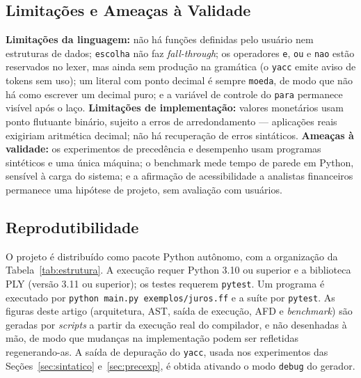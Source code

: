 \documentclass[conference]{IEEEtran}
\begin{document}
\subsection{Limitações e Ameaças à Validade}

\textbf{Limitações da linguagem:} não há funções definidas pelo usuário nem estruturas de dados; \texttt{escolha} não faz \textit{fall-through}; os operadores \texttt{e}, \texttt{ou} e \texttt{nao} estão reservados no lexer, mas ainda sem produção na gramática (o \texttt{yacc} emite aviso de tokens sem uso); um literal com ponto decimal é sempre \texttt{moeda}, de modo que não há como escrever um decimal puro; e a variável de controle do \texttt{para} permanece visível após o laço. \textbf{Limitações de implementação:} valores monetários usam ponto flutuante binário, sujeito a erros de arredondamento --- aplicações reais exigiriam aritmética decimal; não há recuperação de erros sintáticos. \textbf{Ameaças à validade:} os experimentos de precedência e desempenho usam programas sintéticos e uma única máquina; o benchmark mede tempo de parede em Python, sensível à carga do sistema; e a afirmação de acessibilidade a analistas financeiros permanece uma hipótese de projeto, sem avaliação com usuários.

\subsection{Reprodutibilidade}

O projeto é distribuído como pacote Python autônomo, com a organização da Tabela~\ref{tab:estrutura}. A execução requer Python 3.10 ou superior e a biblioteca PLY (versão 3.11 ou superior); os testes requerem \texttt{pytest}. Um programa é executado por \texttt{python main.py exemplos/juros.ff} e a suíte por \texttt{pytest}. As figuras deste artigo (arquitetura, AST, saída de execução, AFD e \textit{benchmark}) são geradas por \textit{scripts} a partir da execução real do compilador, e não desenhadas à mão, de modo que mudanças na implementação podem ser refletidas regenerando-as. A saída de depuração do \texttt{yacc}, usada nos experimentos das Seções~\ref{sec:sintatico} e~\ref{sec:precexp}, é obtida ativando o modo \texttt{debug} do gerador.
\end{document}
